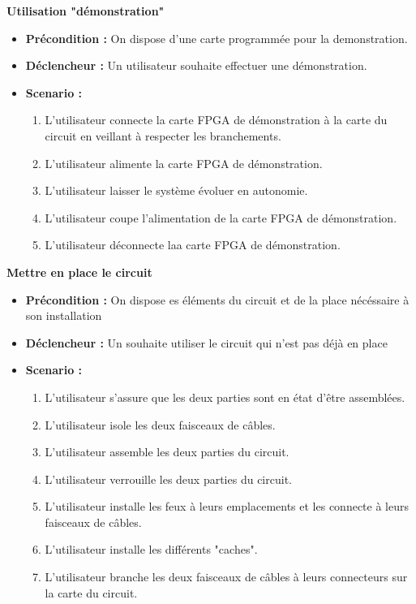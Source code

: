 		\textbf{Utilisation "démonstration"}
		\begin{itemize}
			\item \textbf{Précondition :} On dispose d'une carte programmée pour la demonstration.
			\item \textbf{Déclencheur :} Un utilisateur souhaite effectuer une démonstration.
			\item \textbf{Scenario :}
			\begin{enumerate}
				\item L'utilisateur connecte la carte FPGA de démonstration à la carte du circuit en veillant à respecter les branchements.
				\item L'utilisateur alimente la carte FPGA de démonstration.
				\item L'utilisateur laisser le système évoluer en autonomie.
				\item L'utilisateur coupe l'alimentation de la carte FPGA de démonstration.
				\item L'utilisateur déconnecte laa carte FPGA de démonstration.
			\end{enumerate}
		\end{itemize}

		\textbf{Mettre en place le circuit}
		\begin{itemize}
			\item \textbf{Précondition :} On dispose es éléments du circuit et de la place nécéssaire à son installation
			\item \textbf{Déclencheur :} Un souhaite utiliser le circuit qui n'est pas déjà en place
			\item \textbf{Scenario :}
			\begin{enumerate}
				\item L'utilisateur s'assure que les deux parties sont en état d'être assemblées.
				\item L'utilisateur isole les deux faisceaux de câbles.
				\item L'utilisateur assemble les deux parties du circuit.
				\item L'utilisateur verrouille les deux parties du circuit.
				\item L'utilisateur installe les feux à leurs emplacements et les connecte à leurs faisceaux de câbles.
				\item L'utilisateur installe les différents "caches".
				\item L'utilisateur branche les deux faisceaux de câbles à leurs connecteurs sur la carte du circuit.
			\end{enumerate}
		\end{itemize}

